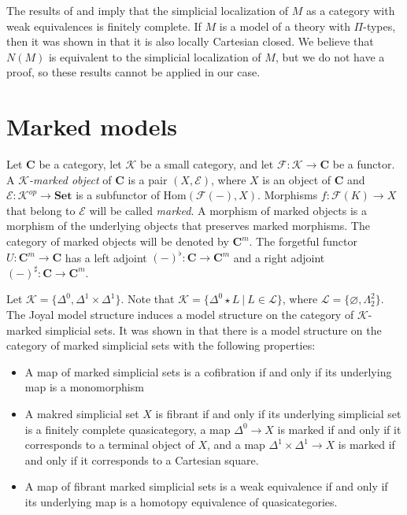 \documentclass[reqno]{amsart}
\theoremstyle{definition}
\theoremstyle{remark}
\newcommand{\cat}[1]{\mathbf{#1}}
\newcommand{\C}{\cat{C}}
\newcommand{\Set}{\cat{Set}}
\newcommand{\K}{$\mathcal{K}$}
\newcommand{\join}{\star}
\newcommand{\Hom}{\mathrm{Hom}}
\numberwithin{figure}{section}
\begin{document}
The results of \cite{szumilo} and \cite{kapulkin-szumilo} imply that the simplicial localization of $M$ as a category with weak equivalences is finitely complete.
If $M$ is a model of a theory with $\Pi$-types, then it was shown in \cite{kapulkin} that it is also locally Cartesian closed.
We believe that $N(M)$ is equivalent to the simplicial localization of $M$, but we do not have a proof, so these results cannot be applied in our case.

\section{Marked models}

Let $\C$ be a category, let $\mathcal{K}$ be a small category, and let $\mathcal{F} : \mathcal{K} \to \C$ be a functor.
A \emph{\K-marked object} of $\C$ is a pair $(X,\mathcal{E})$, where $X$ is an object of $\C$ and $\mathcal{E} : \mathcal{K}^{op} \to \Set$ is a subfunctor of $\Hom(\mathcal{F}(-),X)$.
Morphisms $f : \mathcal{F}(K) \to X$ that belong to $\mathcal{E}$ will be called \emph{marked}.
A morphism of marked objects is a morphism of the underlying objects that preserves marked morphisms.
The category of marked objects will be denoted by $\C^m$.
The forgetful functor $U : \C^m \to \C$ has a left adjoint $(-)^\flat : \C \to \C^m$ and a right adjoint $(-)^\sharp : \C \to \C^m$.

Let $\mathcal{K} = \{ \Delta^0, \Delta^1 \times \Delta^1 \}$.
Note that $\mathcal{K} = \{ \Delta^0 \join L\ |\ L \in \mathcal{L} \}$, where $\mathcal{L} = \{ \varnothing, \Lambda^2_2 \}$.
The Joyal model structure induces a model structure on the category of \K-marked simplicial sets.
It was shown in \cite{marked-obj} that there is a model structure on the category of marked simplicial sets with the following properties:
\begin{itemize}
\item A map of marked simplicial sets is a cofibration if and only if its underlying map is a monomorphism
\item A makred simplicial set $X$ is fibrant if and only if its underlying simplicial set is a finitely complete quasicategory,
a map $\Delta^0 \to X$ is marked if and only if it corresponds to a terminal object of $X$, and
a map $\Delta^1 \times \Delta^1 \to X$ is marked if and only if it corresponds to a Cartesian square.
\item A map of fibrant marked simplicial sets is a weak equivalence if and only if its underlying map is a homotopy equivalence of quasicategories.
\end{itemize}
\end{document}

